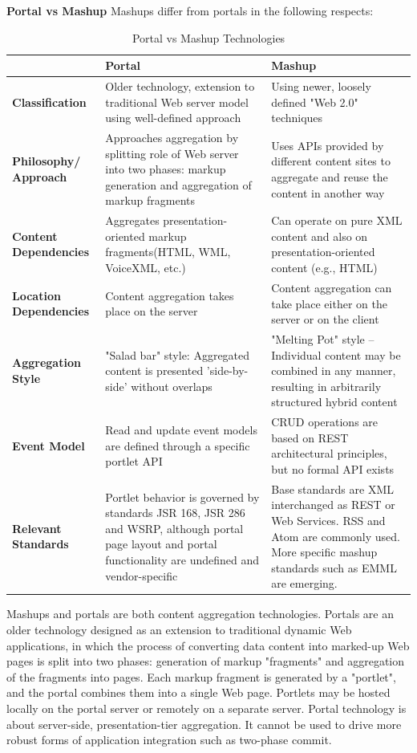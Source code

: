         \textbf{Portal vs Mashup}
		\newline
		Mashups differ from portals in the following respects:
		\begin{table}[H]
		\centering
		\begin{tabular}{|L{3cm}|L{5,5cm}|L{6cm}|}
		\hline
				                       & \textbf{Portal} & \textbf{Mashup} \\
		\hline 
		\textbf{Classification}   & Older technology, extension to traditional Web server model using well-defined approach & Using newer, loosely defined "Web 2.0" techniques \\
		\hline
		\textbf{Philosophy/ Approach}       & Approaches aggregation by splitting role of Web server into two phases: markup generation and aggregation of markup fragments & Uses APIs provided by different content sites to aggregate and reuse the content in another way \\
		\hline
		\textbf{Content Dependencies}	   & Aggregates presentation-oriented markup fragments(HTML, WML, VoiceXML, etc.) & Can operate on pure XML content and also on presentation-oriented content (e.g., HTML) \\
		\hline
		\textbf{Location Dependencies}  & Content aggregation takes place on the server & Content aggregation can take place either on the server or on the client \\
		\hline
		\textbf{Aggregation Style}		   & "Salad bar" style: Aggregated content is presented 'side-by-side' without overlaps & "Melting Pot" style – Individual content may be combined in any manner, resulting in arbitrarily structured hybrid content \\
		\hline
		\textbf{Event Model}		       & Read and update event models are defined through a specific portlet API & CRUD operations are based on REST architectural principles, but no formal API exists \\
		\hline
		\textbf{Relevant Standards}		   & Portlet behavior is governed by standards JSR 168, JSR 286 and WSRP, although portal page layout and portal functionality are undefined and vendor-specific & Base standards are XML interchanged as REST or Web Services. RSS and Atom are commonly used. More specific mashup standards such as EMML are emerging. \\
		\hline
		\end{tabular}
		\caption[Portal vs Mashup Technology]{Portal vs Mashup Technologies}
		\label{tab:Portal_Mashup}
		\end{table}
		Mashups and portals are both content aggregation technologies. Portals are an older technology designed as an extension to traditional dynamic Web applications, in which the process of converting data content into marked-up Web pages is split into two phases: generation of markup "fragments" and aggregation of the fragments into pages. Each markup fragment is generated by a "portlet", and the portal combines them into a single Web page. Portlets may be hosted locally on the portal server or remotely on a separate server. 		Portal technology is about server-side, presentation-tier aggregation. It cannot be used to drive more robust forms of application integration such as two-phase commit.
		
